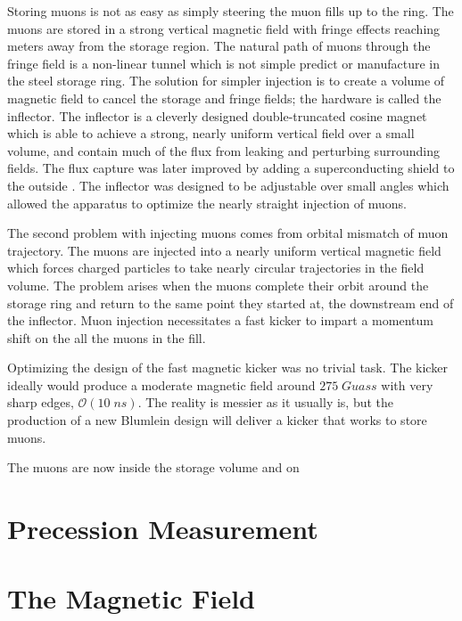Storing muons is not as easy as simply steering the muon fills up to the ring.  The muons are stored in a strong vertical magnetic field with fringe effects reaching meters away from the storage region.  The natural path of muons through the fringe field is a non-linear tunnel which is not simple predict or manufacture in the steel storage ring.  The solution for simpler injection is to create a volume of magnetic field to cancel the storage and fringe fields; the hardware is called the inflector.  The inflector is a cleverly designed double-truncated cosine magnet which is able to achieve a strong, nearly uniform vertical field over a small volume, and contain much of the flux from leaking and perturbing surrounding fields.  The flux capture was later improved by adding a superconducting shield to the outside .  The inflector was designed to be adjustable over small angles which allowed the apparatus to optimize the nearly straight injection of muons.


The second problem with injecting muons comes from orbital mismatch of muon trajectory.  The muons are injected into a nearly uniform vertical magnetic field which forces charged particles to take nearly circular trajectories in the field volume.  The problem arises when the muons complete their orbit around the storage ring and return to the same point they started at, the downstream end of the inflector.  Muon injection necessitates a fast kicker to impart a momentum shift on the all the muons in the fill.  

Optimizing the design of the \gmtwo fast magnetic kicker was no trivial task.  The kicker ideally would produce a moderate magnetic field around $275\;Guass$ with very sharp edges, $\mathcal{O}(10\;ns)$. The reality is messier as it usually is, but the production of a new Blumlein  design will deliver a kicker that works to store muons.


The muons are now inside the storage volume and on 

\section{Precession Measurement}

\section{The Magnetic Field}

